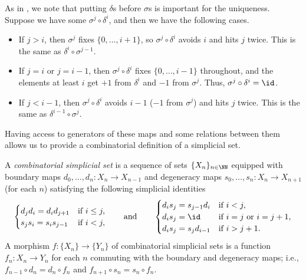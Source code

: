 \documentclass[../notes.tex]{subfiles}
\begin{document}
\begin{remark} \label{rem:delta-sigma-relation}
	As in , we note that putting $\delta$s before $\sigma$s is important for the uniqueness. Suppose we have some $\sigma^j\circ\delta^i$, and then we have the following cases.
	\begin{itemize}
		\item If $j>i$, then $\sigma^j$ fixes $\{0,\ldots,i+1\}$, so $\sigma^j\circ\delta^i$ avoids $i$ and hits $j$ twice. This is the same as $\delta^i\circ\sigma^{j-1}$.
		\item If $j=i$ or $j=i-1$, then $\sigma^j\circ\delta^i$ fixes $\{0,\ldots,i-1\}$ throughout, and the elements at least $i$ get $+1$ from $\delta^i$ and $-1$ from $\sigma^j$. Thus, $\sigma^j\circ\delta^i=\id$.
		\item If $j<i-1$, then $\sigma^j\circ\delta^i$ avoids $i-1$ ($-1$ from $\sigma^j$) and hits $j$ twice. This is the same as $\delta^{i-1}\circ\sigma^j$.
	\end{itemize}
\end{remark}
Having access to generators of these maps and some relations between them allows us to provide a combinatorial definition of a simplicial set.
\begin{definition}
	A \textit{combinatorial simplicial set} is a sequence of sets $\{X_n\}_{n\in\NN}$ equipped with boundary maps $d_0,\ldots,d_n\colon X_n\to X_{n-1}$ and degeneracy maps $s_0,\ldots,s_n\colon X_n\to X_{n+1}$ (for each $n$) satisfying the following simplicial identities
	\[\begin{cases}
		d_jd_i=d_id_{j+1} & \text{if }i\le j, \\
		s_js_i=s_is_{j-1} & \text{if }i<j, \\
	\end{cases}\qquad\text{and}\qquad\begin{cases}
		d_is_j=s_{j-1}d_i & \text{if }i<j, \\
		d_is_j={\id} & \text{if }i=j\text{ or }i=j+1, \\
		d_is_j=s_jd_{i-1} & \text{if }i>j+1.
	\end{cases}\]
	A morphism $f\colon \{X_n\}\to \{Y_n\}$ of combinatorial simplicial sets is a function $f_n\colon X_n\to Y_n$ for each $n$ commuting with the boundary and degeneracy maps; i.e., $f_{n-1}\circ d_n=d_n\circ f_n$ and $f_{n+1}\circ s_n=s_n\circ f_n$.
\end{definition}
\end{document}
